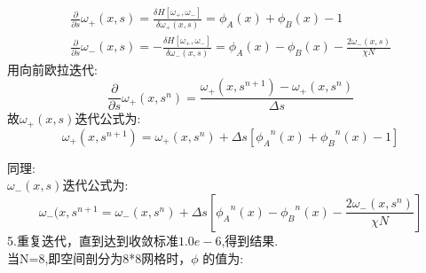\documentclass[12pt]{article}
\begin{document}
\begin{CJK}{UTF8}{gkai}
     \begin{gather}    
     \frac{\partial}{\partial s}\omega_+(x,s)=\frac{\delta H[\omega_+,\omega_-]}{\delta \omega_+(x,s)}=\phi _A(x)+\phi _B(x)-1\\
     \frac{\partial}{\partial s}\omega_-(x,s)=-\frac{\delta H[\omega_+,\omega_-]}{\delta \omega_-(x,s)}=\phi _A(x)-\phi _B(x)-\frac{2\omega_-(x,s)}{\chi N} 
     \end{gather}
     用向前欧拉迭代:\\
     
     $$\frac{\partial}{\partial s}\omega_+(x,s^n)=\dfrac{\omega_+(x,s^{n+1})-\omega_+(x,s^{n})}{\Delta s}$$
     故$\omega_+(x,s)$迭代公式为:\\
     $$\omega_+(x,s^{n+1})=\omega_+(x,s^n)+\Delta s[{\phi _A}^n(x)+{\phi _B}^n(x)-1]$$
     
     同理:\\
     
     $\omega_-(x,s)$迭代公式为:\\
     $$\omega_-(x,s^{n+1}=\omega_-(x,s^n)+\Delta s[{\phi _A}^n(x)-{\phi _B}^n(x)-\frac{2\omega_-(x,s^n)}{\chi N}]$$
     5.重复迭代，直到达到收敛标准$1.0e-6$,得到结果.\\
     
    当N=8,即空间剖分为8*8网格时，$\phi$ 的值为:
    \begin{table}[H]
    	\centering
    	\begin{tabular}{ccccccccc}
    		

\end{tabular}
\end{table}
\end{CJK}
\end{document}
